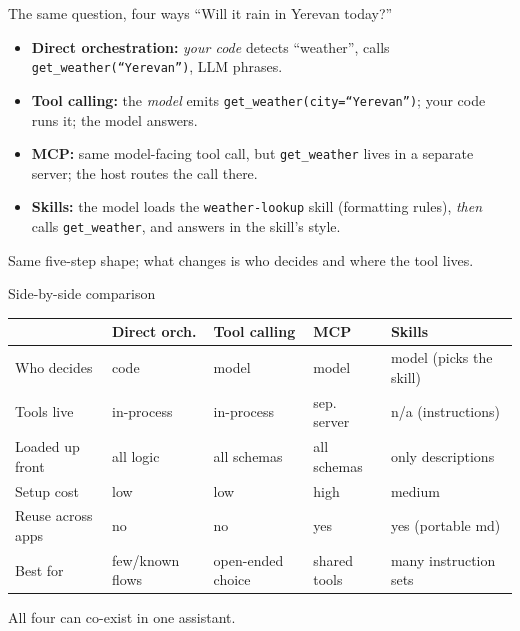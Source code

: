 \documentclass[aspectratio=169,10pt]{beamer}
\begin{document}
\begin{frame}{The same question, four ways}
  \small ``Will it rain in Yerevan today?''
  \begin{itemize}
    \item \textbf{Direct orchestration:} \emph{your code} detects ``weather'', calls \texttt{get\_weather(``Yerevan'')}, LLM phrases.
    \item \textbf{Tool calling:} the \emph{model} emits \texttt{get\_weather(city=``Yerevan'')}; your code runs it; the model answers.
    \item \textbf{MCP:} same model-facing tool call, but \texttt{get\_weather} lives in a \alert{separate server}; the host routes the call there.
    \item \textbf{Skills:} the model loads the \texttt{weather-lookup} skill (formatting rules), \emph{then} calls \texttt{get\_weather}, and answers in the skill's style.
  \end{itemize}
  \vfill
  \footnotesize Same five-step shape; what changes is \alert{who decides} and \alert{where the tool lives}.
\end{frame}

\begin{frame}{Side-by-side comparison}
  \scriptsize
  \begin{tabular}{@{}p{2.1cm}p{1.7cm}p{1.7cm}p{1.7cm}p{3.2cm}@{}}
    \toprule
    & \textbf{Direct orch.} & \textbf{Tool calling} & \textbf{MCP} & \textbf{Skills} \\
    \midrule
    Who decides      & code        & model        & model        & model (picks the skill) \\
    Tools live       & in-process  & in-process   & sep. server  & n/a (instructions) \\
    Loaded up front  & all logic   & all schemas  & all schemas  & \alert{only descriptions} \\
    Setup cost       & low         & low          & \alert{high} & medium \\
    Reuse across apps& no          & no           & \alert{yes}  & yes (portable md) \\
    Best for         & few/known flows & open-ended choice & shared tools & many instruction sets \\
    \bottomrule
  \end{tabular}
  \vfill
  \footnotesize All four can co-exist in one assistant.
\end{frame}
\end{document}
